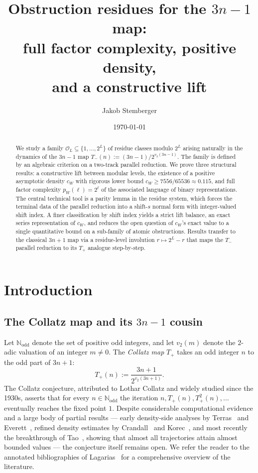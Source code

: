 \documentclass[11pt,reqno]{amsart}
\title[Obstruction residues for the $3n-1$ map]{Obstruction residues for the \texorpdfstring{$3n-1$}{3n-1} map:\\
  full factor complexity, positive density,\\ and a constructive lift}
\author{Jakob Stemberger}
\date{\today}
\newcommand{\Tplus}{T_{+}}
\newcommand{\Tminus}{T_{-}}
\newcommand{\N}{\mathbb{N}}
\newcommand{\Nodd}{\N_{\mathrm{odd}}}
\newcommand{\Obs}{\mathcal{O}}
\newcommand{\vtwo}{v_{2}}
\begin{document}
\begin{abstract}
We study a family $\Obs_L \subseteq \{1, \ldots, 2^L\}$ of residue classes
modulo $2^L$ arising naturally in the dynamics of the $3n-1$ map
$\Tminus(n) := (3n-1)/2^{\vtwo(3n-1)}$. The family is defined by an
algebraic criterion on a two-track parallel reduction.
We prove three structural results: a constructive lift between
modular levels, the existence of a positive asymptotic density $c_W$
with rigorous lower bound $c_W \ge 7556/65536 \approx 0.115$, and full
factor complexity $p_W(\ell) = 2^\ell$ of the associated language of binary
representations.
The central technical tool is a parity lemma in the residue system, which
forces the terminal data of the parallel reduction into a shift-$s$ normal
form with integer-valued shift index. A finer classification by shift
index yields a strict lift balance, an exact series representation of
$c_W$, and reduces the open question of $c_W$'s exact value to a single
quantitative bound on a sub-family of atomic obstructions. Results
transfer to the classical $3n+1$ map via a residue-level involution
$r \mapsto 2^L - r$ that maps the $\Tminus$ parallel reduction to its
$\Tplus$ analogue step-by-step.
\end{abstract}

\maketitle

\section{Introduction}

\subsection{The Collatz map and its \texorpdfstring{$3n-1$}{3n-1} cousin}

Let $\Nodd$ denote the set of positive odd integers, and let $\vtwo(m)$ denote
the $2$-adic valuation of an integer $m \ne 0$. The \emph{Collatz map}
$\Tplus$ takes an odd integer $n$ to the odd part of $3n+1$:
\[
\Tplus(n) := \frac{3n+1}{2^{\vtwo(3n+1)}}.
\]
The Collatz conjecture, attributed to Lothar Collatz and widely studied since
the 1930s, asserts that for every $n \in \Nodd$ the iteration
$n, \Tplus(n), \Tplus^2(n), \ldots$ eventually reaches the fixed point $1$.
Despite considerable computational evidence and a large body of partial
results --- early density-side analyses by Terras~\cite{Terras1976} and
Everett~\cite{Everett1977}, refined density estimates by
Crandall~\cite{Crandall1978} and Korec~\cite{Korec1994}, and most recently
the breakthrough of Tao~\cite{Tao2022}, showing that almost all
trajectories attain almost bounded values --- the conjecture itself
remains open. We refer the reader
to the annotated bibliographies of Lagarias~\cite{Lagarias2010,Lagarias2010bib}
for a comprehensive overview of the literature.
\end{document}
